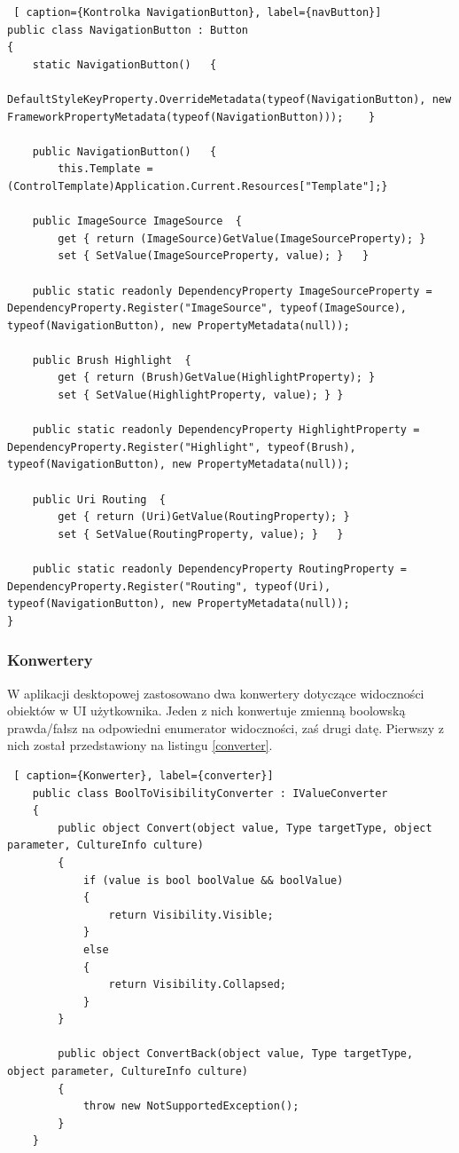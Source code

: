 \documentclass[12pt,oneside]{report}
\begin{document}
\begin{lstlisting} [ caption={Kontrolka NavigationButton}, label={navButton}]	
public class NavigationButton : Button
{
	static NavigationButton()	{
		DefaultStyleKeyProperty.OverrideMetadata(typeof(NavigationButton), new FrameworkPropertyMetadata(typeof(NavigationButton)));	}
	
	public NavigationButton()	{
		this.Template = (ControlTemplate)Application.Current.Resources["Template"];}
	
	public ImageSource ImageSource	{
		get { return (ImageSource)GetValue(ImageSourceProperty); }
		set { SetValue(ImageSourceProperty, value); }	}
	
	public static readonly DependencyProperty ImageSourceProperty = DependencyProperty.Register("ImageSource", typeof(ImageSource), typeof(NavigationButton), new PropertyMetadata(null));
	
	public Brush Highlight	{
		get { return (Brush)GetValue(HighlightProperty); }
		set { SetValue(HighlightProperty, value); }	}
	
	public static readonly DependencyProperty HighlightProperty = DependencyProperty.Register("Highlight", typeof(Brush), typeof(NavigationButton), new PropertyMetadata(null));
	
	public Uri Routing	{
		get { return (Uri)GetValue(RoutingProperty); }
		set { SetValue(RoutingProperty, value); }	}
	
	public static readonly DependencyProperty RoutingProperty = DependencyProperty.Register("Routing", typeof(Uri), typeof(NavigationButton), new PropertyMetadata(null));
}
\end{lstlisting}
\subsubsection{Konwertery}
W aplikacji desktopowej zastosowano dwa konwertery dotyczące widoczności obiektów w UI użytkownika. Jeden z nich konwertuje zmienną boolowską prawda/fałsz na odpowiedni enumerator widoczności, zaś drugi datę. Pierwszy z nich został przedstawiony na listingu \ref{converter}. \\
\begin{lstlisting} [ caption={Konwerter}, label={converter}]	
	public class BoolToVisibilityConverter : IValueConverter
	{
		public object Convert(object value, Type targetType, object parameter, CultureInfo culture)
		{
			if (value is bool boolValue && boolValue)
			{
				return Visibility.Visible;
			}
			else
			{
				return Visibility.Collapsed;
			}
		}
		
		public object ConvertBack(object value, Type targetType, object parameter, CultureInfo culture)
		{
			throw new NotSupportedException();
		}
	}
\end{lstlisting}
\end{document}
